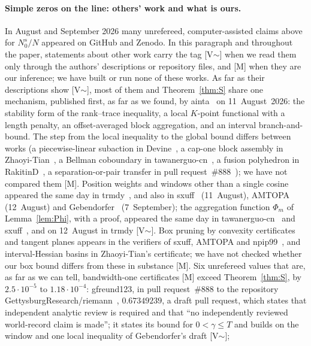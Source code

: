 \paragraph{Simple zeros on the line: others' work and what is ours.}
In August and September 2026 many unrefereed, computer-assisted claims above~\cite{AF} for $N_0^s/N$ appeared on GitHub and Zenodo. In this
paragraph and throughout the paper, statements about other work carry the tag [V$\sim$] when we read them only through the authors'
descriptions or repository files, and [M] when they are our inference; we have built or run none of these works. As far as their descriptions show
[V$\sim$], most of them and Theorem~\ref{thm:S} share one mechanism, published first, as far as we found, by \mbox{ainta}~\cite{ainta} on 11~August~2026: the stability
form of the rank--trace inequality, a local $K$-point functional with a length penalty, an offset-averaged block aggregation, and an interval
branch-and-bound. The step from the local inequality to the global bound differs between works (a piecewise-linear subaction in
Devine~\cite{Devine22066689}, a cap-one block assembly in Zhaoyi-Tian~\cite{ZhaoyiTian}, a Bellman coboundary in
tawanerguo-cn~\cite{TawanRepo}, a fusion polyhedron in \mbox{RakitinD}~\cite{Rakitin}, a separation-or-pair transfer in pull
request~\#888~\cite{Gettysburg888}); we have not compared them [M].
Position weights and windows other than a single cosine appeared the same day in \mbox{trmdy}~\cite{trmdy}, and also in
\mbox{sxuff}~\cite{sxuff} (11~August), \mbox{AMTOPA}~\cite{AMTOPA} (12~August) and Gebendorfer~\cite{Gebendorfer} (7~September); the aggregation function $\Phi_m$ of Lemma~\ref{lem:Phi}, with a
proof, appeared the same day in tawanerguo-cn~\cite{TawanRepo} and \mbox{sxuff}~\cite{sxuff}, and on 12~August in \mbox{trmdy} [V$\sim$]. Box
pruning by convexity certificates and tangent planes appears in the verifiers of \mbox{sxuff}, \mbox{AMTOPA} and \mbox{npip99}~\cite{npip99}, and interval-Hessian
basins in Zhaoyi-Tian's certificate; we have not checked whether our box bound differs from these in substance [M].
Six unrefereed values that are, as far as we can tell, bandwidth-one certificates [M] exceed Theorem~\ref{thm:S}, by $2.5\cdot10^{-5}$ to $1.18\cdot10^{-4}$:
\mbox{gfreund123}, in pull request~\#888 to the repository \mbox{GettysburgResearch/riemann}~\cite{Gettysburg888}, $0.67349239$, a draft pull request,
which states that independent analytic review is required and that ``no independently reviewed world-record claim is made''; it states its
bound for $0<\gamma\le T$ and builds on the window and one local inequality of Gebendorfer's draft [V$\sim$];
